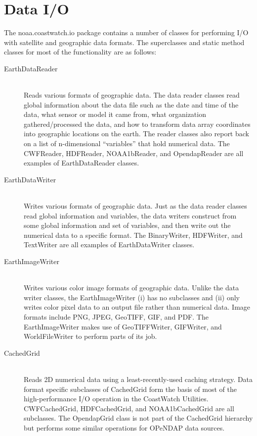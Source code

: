 {\begin{description}
\end{description}

\section{Data I/O}

The {\java noaa.coastwatch.io} package contains a number of classes for
performing I/O with satellite and geographic data formats.  The
superclasses and static method classes for most of the functionality
are as follows:
\begin{description}

\item[{\java EarthDataReader}]~\\ Reads various formats of
geographic data.  The data reader classes read global information
about the data file such as the date and time of the data, what
sensor or model it came from, what organization
gathered/processed the data, and how to transform data array
coordinates into geographic locations on the earth.  The reader
classes also report back on a list of n-dimensional ``variables''
that hold numerical data.  The {\java CWFReader}, {\java HDFReader},
{\java NOAA1bReader}, and {\java OpendapReader} are all examples of
{\java EarthDataReader} classes.

\item[{\java EarthDataWriter}]~\\ Writes various formats of
geographic data.  Just as the data reader classes read global
information and variables, the data writers construct from some
global information and set of variables, and then write out the
numerical data to a specific format.  The {\java BinaryWriter},
{\java HDFWriter}, and {\java TextWriter} are all examples of {\java
EarthDataWriter} classes.

\item[{\java EarthImageWriter}]~\\ Writes various color image
formats of geographic data.  Unlike the data writer classes, the
{\java EarthImageWriter} (i) has no subclasses and (ii) only writes
color pixel data to an output file rather than numerical data.
Image formats include PNG, JPEG, GeoTIFF, GIF, and PDF.  The {\java
EarthImageWriter} makes use of {\java GeoTIFFWriter}, {\java
GIFWriter}, and {\java WorldFileWriter} to perform parts of its
job.

\item[{\java CachedGrid}]~\\ Reads 2D numerical data using a
least-recently-used caching strategy.  Data format specific
subclasses of {\java CachedGrid} form the basis of most of the
high-performance I/O operation in the CoastWatch Utilities.  {\java
CWFCachedGrid}, {\java HDFCachedGrid}, and {\java NOAA1bCachedGrid}
are all subclasses.  The {\java OpendapGrid} class is not part of
the {\java CachedGrid} hierarchy but performs some similar
operations for OPeNDAP data sources.


\end{description}}
